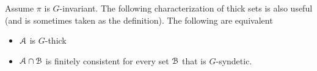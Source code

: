



\begin{exercise}\label{fact_fip2}
  Assume $\pi$ is $G$-invariant.
  The following characterization of thick sets is also useful (and is sometimes taken as the definition).
  The following are equivalent
  \begin{itemize}
    \item[1.] $\EuScript A$ is $G$-thick
    \item[2.] $\EuScript A\cap\EuScript B$ is finitely consistent for every set $\EuScript B$ that is $G$-syndetic.
  \end{itemize}
\end{exercise}




